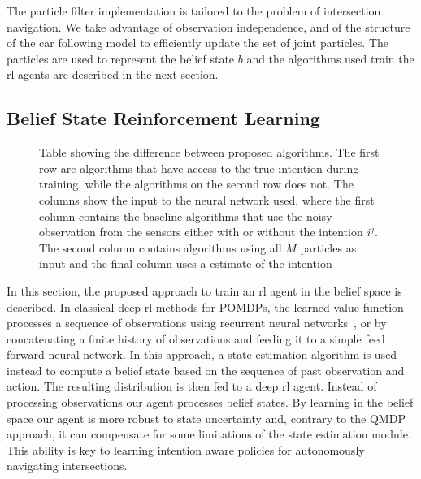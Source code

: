 	
	The particle filter implementation is tailored to the problem of intersection navigation. We take advantage of observation independence, and of the structure of the car following model to efficiently update the set of joint particles. The particles are used to represent the belief state $b$ and the algorithms used train the \gls{rl} agents are described in the next section. 

	\subsection{Belief State Reinforcement Learning}
	\label{sec:belief_state_rl}
	\begin{figure*}[!t]
		\centering
			\caption{Table showing the difference between proposed algorithms. The first row are algorithms that have access to the true intention during training, while the algorithms on the second row does not. The columns show the input to the neural network used, where the first column contains the baseline algorithms that use the noisy observation from the sensors either with or without the intention $i^j$. The second column contains algorithms using all $M$ particles as input and the final column uses a estimate of the intention}
		\label{fig:algorithms}
	\end{figure*}
	In this section, the proposed approach to train an \gls{rl} agent in the belief space is described. 
	In classical deep \gls{rl} methods for POMDPs, the learned value function processes a sequence of observations using recurrent neural networks~\cite{HausknechtS15drqn}, or by concatenating a finite history of observations and feeding it to a simple feed forward neural network\cite{Mnih2015}. In this approach, a state estimation algorithm is used instead to compute a belief state based on the sequence of past observation and action. The resulting distribution is then fed to a deep \gls{rl} agent. Instead of processing observations our agent processes belief states. By learning in the belief space our agent is more robust to state uncertainty and, contrary to the QMDP approach, it can compensate for some limitations of the state estimation module. 
	This ability is key to learning intention aware policies for autonomously navigating intersections.
	
